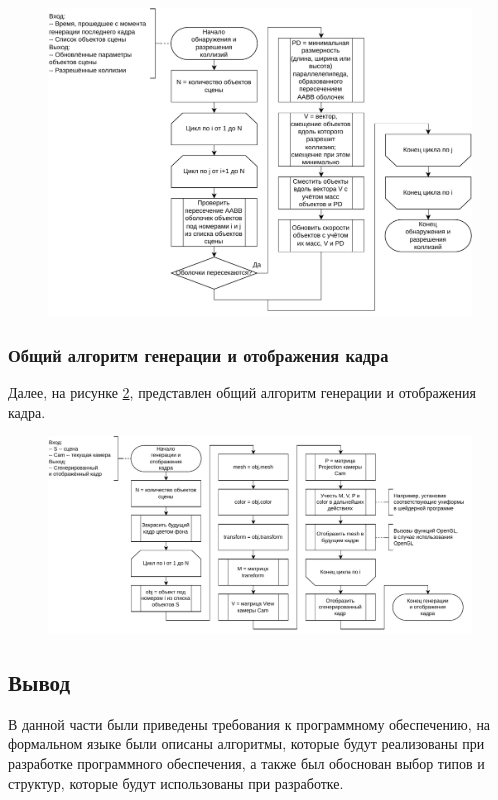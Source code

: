 \begin{figure}[H]
	\centering
	\includegraphics[width=\textwidth]{diag/collisions-algo.pdf}
	\caption{}
	\label{fig:coll}
\end{figure}

\newpage

\subsubsection{Общий алгоритм генерации и отображения кадра}

Далее, на рисунке \ref{fig:framegen}, представлен общий алгоритм генерации и отображения кадра.

\begin{figure}[H]
	\centering
	\includegraphics[width=\textwidth]{diag/frame-gen-algo.pdf}
	\caption{}
	\label{fig:framegen}
\end{figure}

\subsection{Вывод}

В данной части были приведены требования к программному обеспечению, на формальном языке были описаны алгоритмы, которые будут реализованы при разработке программного обеспечения, а также был обоснован выбор типов и структур, которые будут использованы при разработке. %
